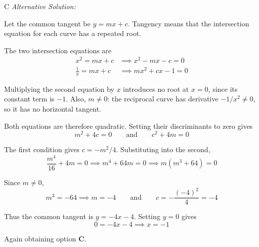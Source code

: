 \documentclass[11pt,a4paper]{article}
\begin{document}
\begin{enumerate}[label=\textbf{\arabic*.},leftmargin=*,itemsep=0pt,start=7]
\begin{djsSolution}{C}
\textit{Alternative Solution:}

Let the common tangent be $y=mx+c$. Tangency means that the intersection equation for each curve has a repeated root.

The two intersection equations are
\[
\begin{aligned}
x^2=mx+c&\implies x^2-mx-c=0\\[5pt]
\frac1x=mx+c&\implies mx^2+cx-1=0
\end{aligned}
\]

Multiplying the second equation by $x$ introduces no root at $x=0$, since its constant term is $-1$. Also, $m\ne0$: the reciprocal curve has derivative $-1/x^2\ne0$, so it has no horizontal tangent.

Both equations are therefore quadratic. Setting their discriminants to zero gives
\[
m^2+4c=0
\qquad\text{and}\qquad
c^2+4m=0
\]

The first condition gives $c=-m^2/4$. Substituting into the second,
\[
\frac{m^4}{16}+4m=0
\implies m^4+64m=0
\implies m(m^3+64)=0
\]

Since $m\ne0$,
\[
m^3=-64\implies m=-4
\qquad\text{and}\qquad
c=-\frac{(-4)^2}{4}=-4
\]

Thus the common tangent is $y=-4x-4$. Setting $y=0$ gives
\[
0=-4x-4\implies x=-1
\]

Again obtaining option \textbf{C}.
\end{djsSolution}
\end{enumerate}
\clearpage
\thispagestyle{djssolutions}
\vspace*{8pt}
\end{document}
